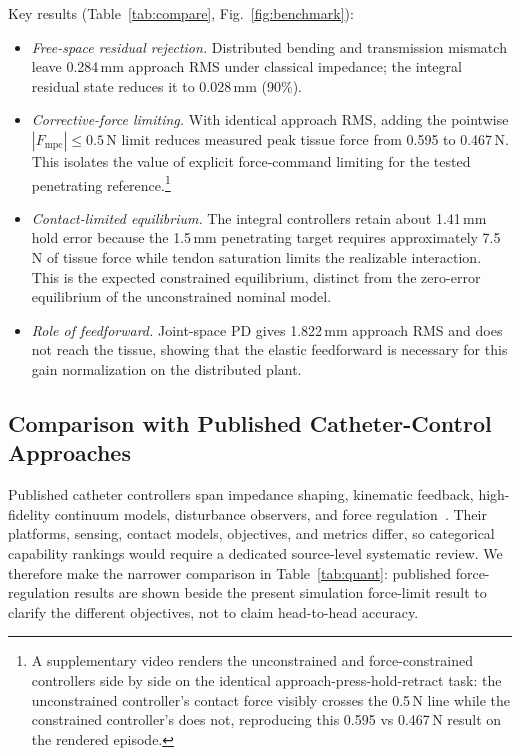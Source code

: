 Key results (Table~\ref{tab:compare}, Fig.~\ref{fig:benchmark}):
\begin{itemize}
\item \emph{Free-space residual rejection.} Distributed bending and transmission mismatch leave 0.284\,mm approach RMS under classical impedance; the integral residual state reduces it to 0.028\,mm (90\%).
\item \emph{Corrective-force limiting.} With identical approach RMS, adding the pointwise $|F_{\text{mpc}}|\le0.5$\,N limit reduces measured peak tissue force from 0.595 to 0.467\,N. This isolates the value of explicit force-command limiting for the tested penetrating reference.\footnote{A supplementary video renders the unconstrained and force-constrained controllers side by side on the identical approach-press-hold-retract task: the unconstrained controller's contact force visibly crosses the 0.5\,N line while the constrained controller's does not, reproducing this 0.595 vs 0.467\,N result on the rendered episode.}
\item \emph{Contact-limited equilibrium.} The integral controllers retain about 1.41\,mm hold error because the 1.5\,mm penetrating target requires approximately 7.5\,N of tissue force while tendon saturation limits the realizable interaction. This is the expected constrained equilibrium, distinct from the zero-error equilibrium of the unconstrained nominal model.
\item \emph{Role of feedforward.} Joint-space PD gives 1.822\,mm approach RMS and does not reach the tissue, showing that the elastic feedforward is necessary for this gain normalization on the distributed plant.
\end{itemize}

\subsection{Comparison with Published Catheter-Control Approaches}

Published catheter controllers span impedance shaping, kinematic feedback, high-fidelity continuum models, disturbance observers, and force regulation~\cite{hogan1985,camarillo2008,yip2014,rucker2011,han2009}. Their platforms, sensing, contact models, objectives, and metrics differ, so categorical capability rankings would require a dedicated source-level systematic review. We therefore make the narrower comparison in Table~\ref{tab:quant}: published force-regulation results are shown beside the present simulation force-limit result to clarify the different objectives, not to claim head-to-head accuracy.

